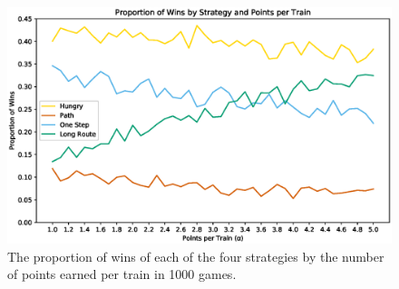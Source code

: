 \begin{figure}[h]
    \centering
    \includegraphics[scale=.65]{figures/points}
    \caption{The proportion of wins of each of the four strategies
    by the number of points earned per train in 1000 games.}
    \label{fig:points}
\end{figure}
